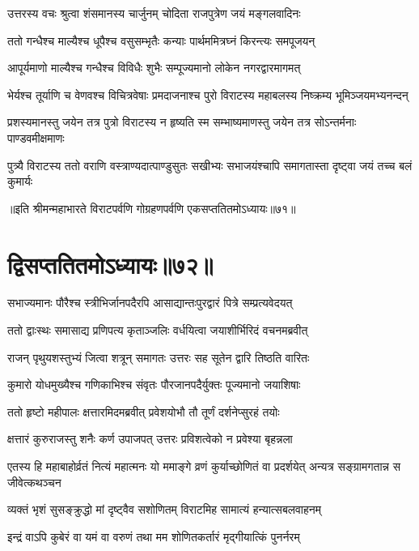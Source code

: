 
\twolineshloka
{उत्तरस्य वचः श्रुत्वा शंसमानस्य चार्जुनम्}
{चोदिता राजपुत्रेण जयं मङ्गलवादिनः}


\twolineshloka
{ततो गन्धैश्च माल्यैश्च धूपैश्च वसुसम्भृतैः}
{कन्याः पार्थममित्रघ्नं किरन्त्यः समपूजयन्}


\twolineshloka
{आपूर्यमाणो माल्यैश्च गन्धैश्च विविधैः शुभैः}
{सम्पूज्यमानो लोकेन नगरद्वारमागमत्}


\fourlineindentedshloka
{भेर्यश्च तूर्याणि च वेणवश्च}
{विचित्रवेषाः प्रमदाजनाश्च}
{पुरो विराटस्य महाबलस्य}
{निष्क्रम्य भूमिञ्जयमभ्यनन्दन्}


\fourlineindentedshloka
{प्रशस्यमानस्तु जयेन तत्र}
{पुत्रो विराटस्य न हृष्यति स्म}
{सम्भाष्यमाणस्तु जयेन तत्र}
{सोऽन्तर्मनाः पाण्डवमीक्षमाणः}


\fourlineindentedshloka
{पुत्र्यै विराटस्य ततो वराणि}
{वस्त्राण्यदात्पाण्डुसुतः सखीभ्यः}
{सभाजयंश्चापि समागतास्ता}
{दृष्ट्वा जयं तच्च बलं कुमार्यः}

॥इति श्रीमन्महाभारते विराटपर्वणि गोग्रहणपर्वणि एकसप्ततितमोऽध्यायः॥७१॥

\chapter{द्विसप्ततितमोऽध्यायः॥७२॥}

\twolineshloka
{सभाज्यमानः पौरैश्च स्त्रीभिर्जानपदैरपि}
{आसाद्यान्तःपुरद्वारं पित्रे सम्प्रत्यवेदयत्}


\twolineshloka
{ततो द्वाःस्थः समासाद्य प्रणिपत्य कृताञ्जलिः}
{वर्धयित्वा जयाशीर्भिरिदं वचनमब्रवीत्}


\twolineshloka
{राजन् पृथुयशस्तुभ्यं जित्वा शत्रून् समागतः}
{उत्तरः सह सूतेन द्वारि तिष्ठति वारितः}


\twolineshloka
{कुमारो योधमुख्यैश्च गणिकाभिश्च संवृतः}
{पौरजानपदैर्युक्तः पूज्यमानो जयाशिषाः}


\twolineshloka
{ततो हृष्टो महीपालः क्षत्तारमिदमब्रवीत्}
{प्रवेशयोभौ तौ तूर्णं दर्शनेप्सुरहं तयोः}


\twolineshloka
{क्षत्तारं कुरुराजस्तु शनैः कर्ण उपाजपत्}
{उत्तरः प्रविशत्वेको न प्रवेश्या बृहन्नला}


\threelineshloka
{एतस्य हि महाबाहोर्व्रतं नित्यं महात्मनः}
{यो ममाङ्गे व्रणं कुर्याच्छोणितं वा प्रदर्शयेत्}
{अन्यत्र सङ्ग्रामगतान्न स जीवेत्कथञ्चन}


\twolineshloka
{व्यक्तं भृशं सुसङ्क्रुद्धो मां दृष्ट्वैव सशोणितम्}
{विराटमिह सामात्यं हन्यात्सबलवाहनम्}


\twolineshloka
{इन्द्रं वाऽपि कुबेरं वा यमं वा वरुणं तथा}
{मम शोणितकर्तारं मृद्गीयात्किं पुनर्नरम्}


